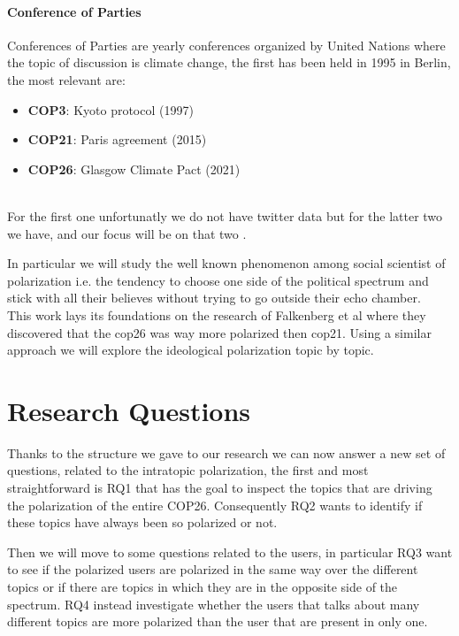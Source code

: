 \paragraph{Conference of Parties}
Conferences of Parties are yearly conferences organized by United Nations where the topic of discussion is climate change, the first has been held in 1995 in Berlin, the most relevant are:
\begin{itemize}
    \item \textbf{COP3}: Kyoto protocol (1997)
    \item \textbf{COP21}: Paris agreement (2015)
    \item \textbf{COP26}: Glasgow Climate Pact (2021)
\end{itemize}

\\

For the first one unfortunatly we do not have twitter data but for the latter two we have, and our focus will be on that two .

In particular we will study the well known phenomenon among social scientist of polarization i.e. the tendency to choose one side of the political spectrum and stick with all their believes without trying to go outside their echo chamber.\\




This work lays its foundations on the research of Falkenberg et al \cite{falkenberg_growing_2022} where they discovered that the cop26 was way more polarized then cop21. Using a similar approach we will explore the ideological polarization topic by topic. 


\section{Research Questions}
Thanks to the structure we gave to our research we can now answer a new set of questions, related to the intratopic polarization, the first and most straightforward is RQ1 that has the goal to inspect the topics that are driving the polarization of the entire COP26. Consequently RQ2 wants to identify if these topics have always been so polarized or not.

Then we will move to some questions related to the users, in particular RQ3 want to see if the polarized users are polarized in the same way over the different topics or if there are topics in which they are in the opposite side of the spectrum. RQ4 instead investigate whether the users that talks about many different topics are more polarized than the user that are present in only one.

